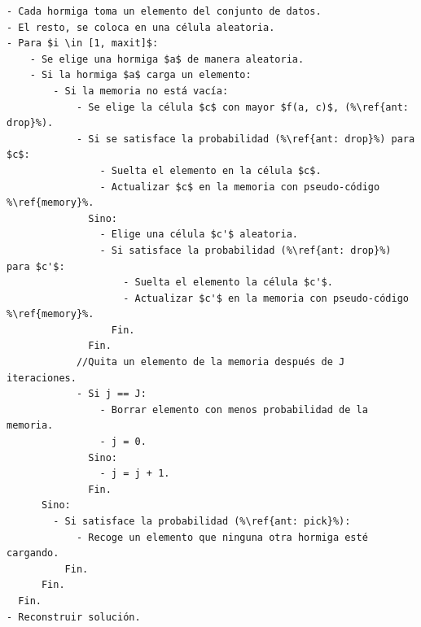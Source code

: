 \begin{lstlisting}[float=!h, caption=Algoritmo de Hormiga, label=Ant]
- Cada hormiga toma un elemento del conjunto de datos.
- El resto, se coloca en una célula aleatoria.
- Para $i \in [1, maxit]$:
    - Se elige una hormiga $a$ de manera aleatoria.
    - Si la hormiga $a$ carga un elemento:
        - Si la memoria no está vacía:
            - Se elige la célula $c$ con mayor $f(a, c)$, (%\ref{ant: drop}%).
            - Si se satisface la probabilidad (%\ref{ant: drop}%) para $c$:
                - Suelta el elemento en la célula $c$.
                - Actualizar $c$ en la memoria con pseudo-código %\ref{memory}%.
              Sino:
                - Elige una célula $c'$ aleatoria.
                - Si satisface la probabilidad (%\ref{ant: drop}%) para $c'$:
                    - Suelta el elemento la célula $c'$.
                    - Actualizar $c'$ en la memoria con pseudo-código %\ref{memory}%.
                  Fin.
              Fin.
            //Quita un elemento de la memoria después de J iteraciones.
            - Si j == J:
                - Borrar elemento con menos probabilidad de la memoria.
                - j = 0.
              Sino:
                - j = j + 1.
              Fin.
      Sino:
        - Si satisface la probabilidad (%\ref{ant: pick}%):
            - Recoge un elemento que ninguna otra hormiga esté cargando.
          Fin.
      Fin.
  Fin.
- Reconstruir solución.
\end{lstlisting}
